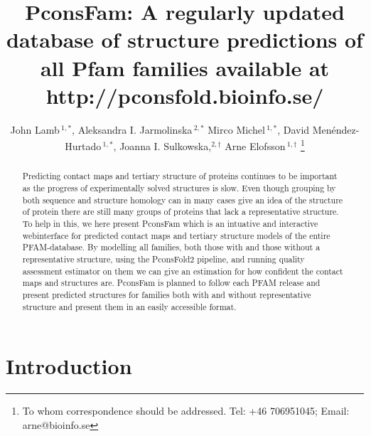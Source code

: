 \documentclass[a4,center,fleqn]{NAR}
\begin{document}
\title{PconsFam: A regularly updated database of structure predictions of all Pfam families available at http://pconsfold.bioinfo.se/}

\author{%
John Lamb\,$^{1,*}$,
Aleksandra I. Jarmolinska\,$^{2,*}$
Mirco Michel\,$^{1,*}$,
David Menéndez-Hurtado\,$^{1,*}$,
Joanna I. Sulkowska,$^{2,\dagger}$
Arne Elofsson\,$^{1,\dagger}$%
\footnote{To whom correspondence should be addressed.
Tel: +46 706951045; Email: arne@bioinfo.se}}

\address{%
$^{1}$Science for Life Laboratory and Department of Biochemistry and
biophysics, Stockholm Unviersity, Tomtebodav 23, 171 21 Solna, Sweden
and
$^{2}$ Centre of New Technologies, University of Warsaw, Banacha 2c, 02-097 Warsaw,
Poland
$^{*}$ contributed equally
$^{\dagger}$=contributing authors
}


\maketitle




\begin{abstract}
Predicting contact maps and tertiary structure of proteins continues
to be important as the progress of experimentally solved structures
is slow. 
Even though grouping by both sequence and structure homology can in many
cases give an idea of the structure of protein there are still
many groups of proteins that lack a representative structure.
To help in this, we here present PconsFam which is an intuative and
interactive webinterface for predicted contact maps and tertiary
structure models of the entire PFAM-database.
By modelling all families, both those with and those without a
representative structure, using the PconsFold2 pipeline, and running
quality assessment estimator on them we can give an estimation for how
confident the contact maps and structures are. 
PconsFam is planned to follow each PFAM release and present predicted
structures for families both with and without representative structure
and present them in an easily accessible format.

\end{abstract}

\section{Introduction}
\end{document}
